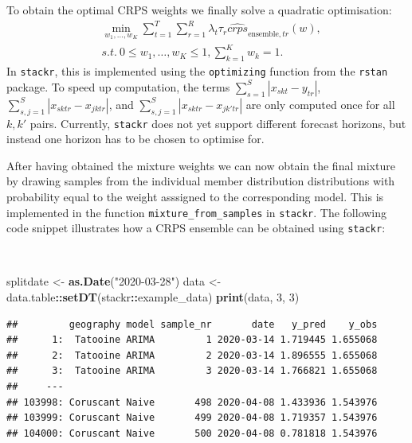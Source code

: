 \documentclass[
]{book}
\newenvironment{Shaded}{\begin{snugshade}}{\end{snugshade}}
\newcommand{\DecValTok}[1]{\textcolor[rgb]{0.00,0.00,0.81}{#1}}
\newcommand{\KeywordTok}[1]{\textcolor[rgb]{0.13,0.29,0.53}{\textbf{#1}}}
\newcommand{\NormalTok}[1]{#1}
\newcommand{\OperatorTok}[1]{\textcolor[rgb]{0.81,0.36,0.00}{\textbf{#1}}}
\newcommand{\StringTok}[1]{\textcolor[rgb]{0.31,0.60,0.02}{#1}}
\begin{document}
To obtain the optimal CRPS weights we finally solve a quadratic optimisation:
\begin{align*}
 &\min_{w_1, \dots, w_K} \sum_{t=1}^T  \sum_{r=1}^R\lambda_t\tau_r  \widehat {crps}_{\text{ensemble}, tr} (w), \\
  &s.t. ~{0\leq w_1, \dots, w_K \leq 1, \sum_{k=1}^K w_k=1}. 
\end{align*}
In \texttt{stackr}, this is implemented using the \texttt{optimizing} function from the \texttt{rstan} \citep{R-rstan} package. To speed up computation, the terms \(\sum_{s=1}^S |x_{skt}-y_{tr}|\), \(\sum_{s, j=1}^S |x_{sktr}- x_{jktr}|\), and \(\sum_{s, j=1}^S |x_{sktr}- x_{jk'tr}|\) are only computed once for all \(k, k'\) pairs. Currently, \texttt{stackr} does not yet support different forecast horizons, but instead one horizon has to be chosen to optimise for.

After having obtained the mixture weights we can now obtain the final mixture by drawing samples from the individual member distribution distributions with probability equal to the weight asssigned to the corresponding model. This is implemented in the function \texttt{mixture\_from\_samples} in \texttt{stackr}. The following code snippet illustrates how a CRPS ensemble can be obtained using \texttt{stackr}:

\(~\)

\begin{Shaded}
\begin{Highlighting}[]
\NormalTok{splitdate \textless{}{-}}\StringTok{ }\KeywordTok{as.Date}\NormalTok{(}\StringTok{"2020{-}03{-}28"}\NormalTok{)}
\NormalTok{data \textless{}{-}}\StringTok{ }\NormalTok{data.table}\OperatorTok{::}\KeywordTok{setDT}\NormalTok{(stackr}\OperatorTok{::}\NormalTok{example\_data)}
\KeywordTok{print}\NormalTok{(data, }\DecValTok{3}\NormalTok{, }\DecValTok{3}\NormalTok{)}
\end{Highlighting}
\end{Shaded}

\begin{verbatim}
##         geography model sample_nr       date   y_pred    y_obs
##      1:  Tatooine ARIMA         1 2020-03-14 1.719445 1.655068
##      2:  Tatooine ARIMA         2 2020-03-14 1.896555 1.655068
##      3:  Tatooine ARIMA         3 2020-03-14 1.766821 1.655068
##     ---                                                       
## 103998: Coruscant Naive       498 2020-04-08 1.433936 1.543976
## 103999: Coruscant Naive       499 2020-04-08 1.719357 1.543976
## 104000: Coruscant Naive       500 2020-04-08 0.781818 1.543976
\end{verbatim}
\end{document}

